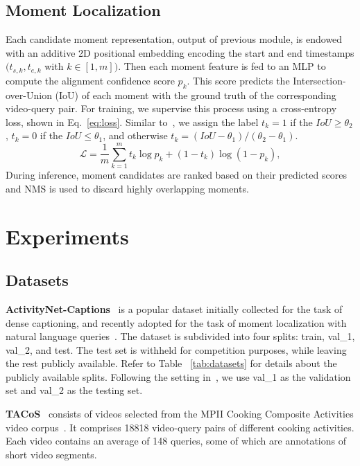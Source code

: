 \documentclass[10pt,twocolumn,letterpaper]{article}
\begin{document}
\subsection{Moment Localization}\label{subsec: Loc}
Each candidate moment representation, output of previous module, is endowed with an additive 2D positional embedding encoding the start and end timestamps $(t_{s,k},t_{e,k}$ with $k \in [1,m])$. Then each moment feature is fed to an MLP to compute the alignment confidence score $p_k$. This score predicts the Intersection-over-Union (IoU) of each moment with the ground truth of the corresponding video-query pair. For training, we supervise this process using a cross-entropy loss, shown in Eq.~\ref{eq:loss}. Similar to~\cite{2DTAN_2020_AAAI}, we assign the label $t_k=1$ if the $IoU \geq \theta_2$, $t_k=0$ if the $IoU \leq \theta_1$, and otherwise $t_k=(IoU-\theta_1)/(\theta_2-\theta_1)$. 
\begin{equation}
    \mathcal{L} =\frac{1}{m}\sum_{k=1}^m t_k \log p_k + (1-t_k) \log(1-p_k),
\label{eq:loss}
\end{equation} 
During inference, moment candidates are ranked based on  their predicted scores and NMS is used to discard highly overlapping moments. 
 \section{Experiments}\label{sec: experiments}
\subsection{Datasets} 
\noindent\textbf{ActivityNet-Captions}~\cite{Krishna_2017_ICCV} is a popular  dataset initially collected for the task of dense captioning, and recently adopted for the task of moment localization with natural language queries~\cite{chen_etal_2018_temporally,lin2020moment}. The dataset is subdivided into four splits: train, val\_1,  val\_2, and test. The test set is withheld for competition purposes, while leaving the rest publicly available. Refer to  Table ~\ref{tab:datasets}
for details about the publicly available splits. Following the setting in~\cite{lin2020moment}, we use val\_1 as the validation set and val\_2 as the testing set.

\noindent\textbf{TACoS}~\cite{TACoS_ACL_2013} consists of videos selected from the MPII Cooking Composite Activities video corpus~\cite{rohrbach2012script}. It comprises 18818 video-query pairs of different cooking activities. Each video contains an average of 148 queries, some of which are annotations of short video segments. 
\end{document}
